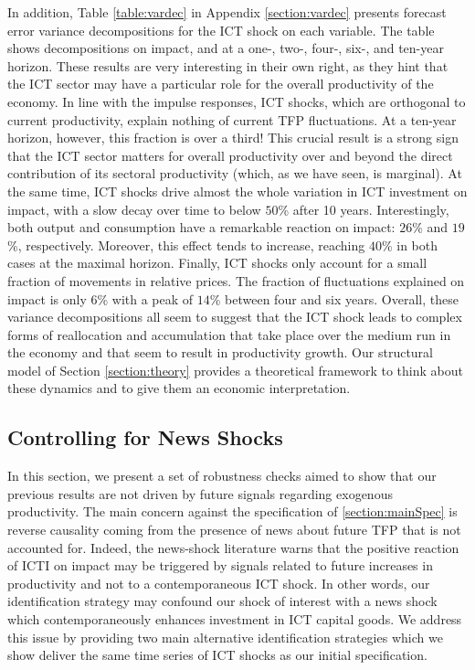 \documentclass[12pt]{article}
\begin{document}
In addition, Table \ref{table:vardec} in Appendix \ref{section:vardec} presents forecast error variance decompositions for the ICT shock on each variable. The table shows decompositions on impact, and at a one-, two-, four-, six-, and ten-year horizon. These results are very interesting in their own right, as they hint that the ICT sector may have a particular role for the overall productivity of the economy. In line with the impulse responses, ICT shocks, which are orthogonal to current productivity, explain nothing of current TFP fluctuations. At a ten-year horizon, however, this fraction is over a third! This crucial result is a strong sign that the ICT sector matters for overall productivity over and beyond the direct contribution of its sectoral productivity (which, as we have seen, is marginal). At the same time, ICT shocks drive almost the whole variation in ICT investment on impact, with a slow decay over time to below $50$\% after 10 years. Interestingly, both output and consumption have a remarkable reaction on impact: $26$\% and $19$\%, respectively. Moreover, this effect tends to increase, reaching $40$\% in both cases at the maximal horizon. Finally, ICT shocks only account for a small fraction of movements in relative prices. The fraction of fluctuations explained on impact is only $6$\% with a peak of $14$\% between four and six years. Overall, these variance decompositions all seem to suggest that the ICT shock leads to complex forms of reallocation and accumulation that take place over the medium run in the economy and that seem to result in productivity growth. Our structural model of Section \ref{section:theory} provides a theoretical framework to think about these dynamics and to give them an economic interpretation. 

\subsection{Controlling for News Shocks}

In this section, we present a set of robustness checks aimed to show that our previous results are not driven by future signals regarding exogenous productivity. The main concern against the specification of \ref{section:mainSpec} is reverse causality coming from the presence of news about future TFP that is not accounted for. Indeed, the news-shock literature warns that the positive reaction of ICTI on impact may be triggered by signals related to future increases in productivity and not to a contemporaneous ICT shock. In other words, our identification strategy may confound our shock of interest with a news shock which contemporaneously enhances investment in ICT capital goods. We address this issue by providing two main alternative identification strategies which we show deliver the same time series of ICT shocks as our initial specification. 
\end{document}
